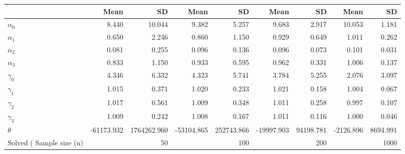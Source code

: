 
\begin{tabular}[t]{lrrrrrrrr}
\toprule
  & Mean & SD & Mean  & SD  & Mean   & SD   & Mean    & SD   \\
\midrule
$\alpha_{0}$ & 8.440 & 10.044 & 9.382 & 5.257 & 9.683 & 2.917 & 10.053 & 1.181\\
$\alpha_{1}$ & 0.650 & 2.246 & 0.860 & 1.150 & 0.929 & 0.649 & 1.011 & 0.262\\
$\alpha_{2}$ & 0.081 & 0.255 & 0.096 & 0.136 & 0.096 & 0.073 & 0.101 & 0.031\\
$\alpha_{3}$ & 0.833 & 1.150 & 0.933 & 0.595 & 0.962 & 0.331 & 1.006 & 0.137\\
$\gamma_{0}$ & 4.346 & 6.332 & 4.323 & 5.741 & 3.784 & 5.255 & 2.076 & 3.097\\
$\gamma_{1}$ & 1.015 & 0.371 & 1.020 & 0.233 & 1.021 & 0.158 & 1.004 & 0.067\\
$\gamma_{2}$ & 1.017 & 0.561 & 1.009 & 0.348 & 1.011 & 0.258 & 0.997 & 0.107\\
$\gamma_{3}$ & 1.009 & 0.242 & 1.008 & 0.167 & 1.011 & 0.116 & 1.000 & 0.046\\
$\theta$ & -61173.932 & 1764262.960 & -53104.865 & 252743.866 & -19997.903 & 94198.781 & -2126.896 & 8694.991\\
Solved (%
Sample size (n) &  & 50 &  & 100 &  & 200 &  & 1000\\
\bottomrule
\end{tabular}
